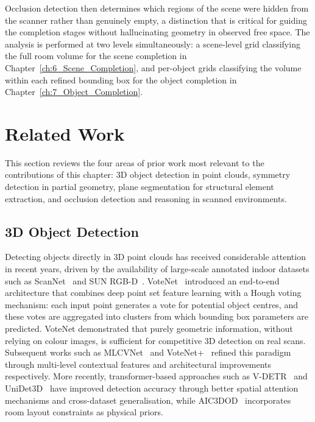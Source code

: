 Occlusion detection then determines which regions of the scene were hidden from the scanner rather than genuinely empty, a distinction that is critical for guiding the completion stages without hallucinating geometry in observed free space. The analysis is performed at two levels simultaneously: a scene-level grid classifying the full room volume for the scene completion in Chapter~\ref{ch:6_Scene_Completion}, and per-object grids classifying the volume within each refined bounding box for the object completion in Chapter~\ref{ch:7_Object_Completion}.


\section{Related Work}
\label{sec:5_related}

This section reviews the four areas of prior work most relevant to the contributions of this chapter: 3D object detection in point clouds, symmetry detection in partial geometry, plane segmentation for structural element extraction, and occlusion detection and reasoning in scanned environments.


\subsection{3D Object Detection}
\label{sec:5_rw_detection}

Detecting objects directly in 3D point clouds has received considerable attention in recent years, driven by the availability of large-scale annotated indoor datasets such as ScanNet~\cite{dai_scannet_2017} and SUN RGB-D~\cite{song_sun_2015}. VoteNet~\cite{qi_deep_2019} introduced an end-to-end architecture that combines deep point set feature learning with a Hough voting mechanism: each input point generates a vote for potential object centres, and these votes are aggregated into clusters from which bounding box parameters are predicted. VoteNet demonstrated that purely geometric information, without relying on colour images, is sufficient for competitive 3D detection on real scans. Subsequent works such as MLCVNet~\cite{xie_mlcvnet_2020} and VoteNet+~\cite{ding_votenet_2020} refined this paradigm through multi-level contextual features and architectural improvements respectively. More recently, transformer-based approaches such as V-DETR~\cite{shen_v-detr_2023} and UniDet3D~\cite{kolodiazhnyi_unidet3d_nodate} have improved detection accuracy through better spatial attention mechanisms and cross-dataset generalisation, while AIC3DOD~\cite{cheng_aic3dod_nodate} incorporates room layout constraints as physical priors.

